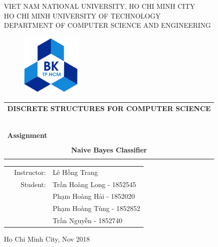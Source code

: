 \documentclass[a4paper]{article}
\begin{document}
\begin{titlepage}
\begin{center}
VIET NAM NATIONAL UNIVERSITY, HO CHI MINH CITY \\
HO CHI MINH UNIVERSITY OF TECHNOLOGY\\
DEPARTMENT OF COMPUTER SCIENCE AND ENGINEERING 
\end{center}

\vspace{1cm}

\begin{figure}[h!]
\begin{center}
\includegraphics[width=3cm]{hcmut.png}
\end{center}
\end{figure}

\vspace{1cm}


\begin{center}
\begin{tabular}{c}
\multicolumn{1}{l}{\textbf{{\Large DISCRETE STRUCTURES FOR COMPUTER SCIENCE}}}\\
~~\\
\hline
\\
\multicolumn{1}{l}{\textbf{{\Large Assignment}}}\\
\\
\textbf{{\Huge Naive Bayes Classifier}}\\
\\
\hline
\end{tabular}
\end{center}

\vspace{3cm}

\begin{table}[h]
\begin{tabular}{rrl}
\hspace{5 cm} & Instructor: & Lê Hồng Trang\\
& Student: & Trần Hoàng Long - 1852545 \\
& & Phạm Hoàng Hải - 1852020 \\
& & Phạm Hoàng Tùng -  1852852\\
& & Trần Nguyễn - 1852740 \\
\end{tabular}
\end{table}

\begin{center}
{\footnotesize Ho Chi Minh City, Nov 2018}
\end{center}
\end{titlepage}
\end{document}
